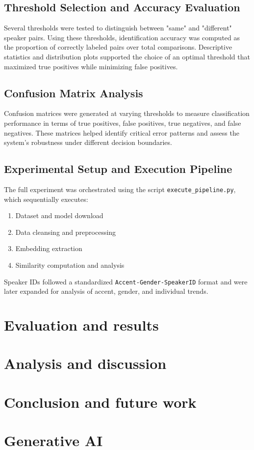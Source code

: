 \documentclass[conference]{IEEEtran}
\begin{document}
\subsection*{Threshold Selection and Accuracy Evaluation}
Several thresholds were tested to distinguish between "same" and "different" speaker pairs. Using these thresholds, identification accuracy was computed as the proportion of correctly labeled pairs over total comparisons. Descriptive statistics and distribution plots supported the choice of an optimal threshold that maximized true positives while minimizing false positives.

\subsection*{Confusion Matrix Analysis}
Confusion matrices were generated at varying thresholds to measure classification performance in terms of true positives, false positives, true negatives, and false negatives. These matrices helped identify critical error patterns and assess the system's robustness under different decision boundaries.

\subsection*{Experimental Setup and Execution Pipeline}
The full experiment was orchestrated using the script \texttt{execute\_pipeline.py}, which sequentially executes:
\begin{enumerate}
	\item Dataset and model download
	\item Data cleansing and preprocessing
	\item Embedding extraction
	\item Similarity computation and analysis
\end{enumerate}
Speaker IDs followed a standardized \texttt{Accent-Gender-SpeakerID} format and were later expanded for analysis of accent, gender, and individual trends.






\section{Evaluation and results}


\section{Analysis and discussion}

\section{Conclusion and future work}




\section*{Generative AI}

\printbibliography


	
\end{document}
